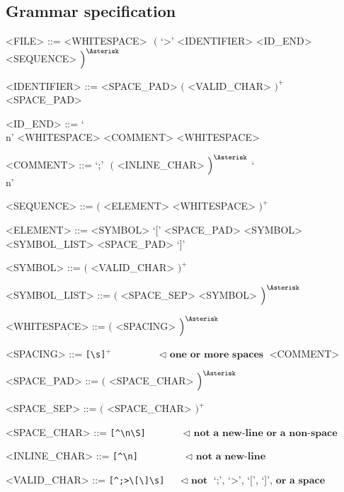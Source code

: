 \documentclass[12pt]{article}
\begin{document}
\pagebreak

\subsection{Grammar specification}

\setlength{\grammarparsep}{12pt plus 1pt minus 1pt} %
\setlength{\grammarindent}{10em} %

\begin{grammar}

  <FILE>         ::=  <WHITESPACE> $\,\,\Big($ `>' <IDENTIFIER> <ID_END> <SEQUENCE> $\Big)^{\Asterisk}$

  <IDENTIFIER>   ::=  <SPACE_PAD> $\Big($ <VALID_CHAR> $\Big)^{+}$ <SPACE_PAD>

  <ID_END>       ::=  `\\n' <WHITESPACE>
                 \alt <COMMENT> <WHITESPACE>

  <COMMENT>      ::=  `;' $\,\,\Big($ <INLINE_CHAR> $\Big)^{\Asterisk}$ `\\n'

  <SEQUENCE>     ::=  $\Big($ <ELEMENT> <WHITESPACE> $\Big)^{+}$
  
  <ELEMENT>      ::=  <SYMBOL>
                 \alt `[' <SPACE_PAD> <SYMBOL> <SYMBOL_LIST> <SPACE_PAD> `]'
 
  <SYMBOL>       ::=  $\Big($ <VALID_CHAR> $\Big)^{+}$
                 
  <SYMBOL_LIST>  ::=  $\Big($ <SPACE_SEP> <SYMBOL> $\Big)^{\Asterisk}$
  
  <WHITESPACE>   ::=  $\Big($ <SPACING> $\Big)^{\Asterisk}$

  <SPACING>      ::=  \verb![\s]!$^{+}$  $\quad\,\quad\quad\quad \lhd \,\, \textbf{one or more spaces}$
                 \alt <COMMENT>

  <SPACE_PAD>    ::=  $\Big($ <SPACE_CHAR> $\Big)^{\Asterisk}$

  <SPACE_SEP>    ::=  $\Big($ <SPACE_CHAR> $\Big)^{+}$

  <SPACE_CHAR>   ::=  \verb![^\n\S]!     $\quad\,\quad\quad      \lhd \,\, \textbf{not a new-line or a non-space}$

  <INLINE_CHAR>  ::=  \verb![^\n]!       $\quad\,\quad\quad\quad \lhd \,\, \textbf{not a new-line}$

  <VALID_CHAR>   ::=  \verb![^;>\[\]\s]! $\quad                  \lhd \,\, \textbf{not}$ `;', `>', `[', `]', $\textbf{or a space}$


  
\end{grammar}
\end{document}
